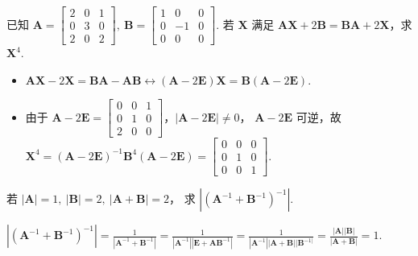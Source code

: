 \begin{problem}[本题8分]
  已知 $\mathbf A = 
  \begin{bmatrix}
    2 & 0 & 1\\
    0 & 3 & 0\\
    2 & 0 & 2
  \end{bmatrix},~
  \mathbf B = 
  \begin{bmatrix}
    1 & 0 & 0\\
    0 &-1 & 0\\
    0 & 0 & 0
  \end{bmatrix}$. 若 $\mathbf X$ 满足
  $\mathbf{AX} + 2\mathbf B = \mathbf{BA} + 2\mathbf X$，求 $\mathbf X^4$.
\end{problem}
\scratch[14ex]
\begin{solution}\leavevmode
  \begin{itemize}
    \item $\mathbf{AX} - 2\mathbf X = \mathbf{BA} - \mathbf{AB}
    \longleftrightarrow
      (\mathbf A - 2\mathbf E)\mathbf X = \mathbf B(\mathbf A - 2\mathbf E)$.
    \item 由于 $\mathbf A - 2\mathbf E =
    \begin{bmatrix}
      0 & 0 & 1\\
      0 & 1 & 0\\
      2 & 0 & 0
    \end{bmatrix}$，$|\mathbf A - 2\mathbf E| \neq 0$，
    $\mathbf A - 2\mathbf E$ 可逆，故
    $ \mathbf X^4 =
      (\mathbf A - 2\mathbf E)^{-1}\mathbf B^4(\mathbf A - 2\mathbf E)=
    \begin{bmatrix}
      0 & 0 & 0\\
      0 & 1 & 0\\
      0 & 0 & 1
    \end{bmatrix}$.
  \end{itemize}
\end{solution}

\begin{problem}[本题8分]
  若 $|\mathbf A| = 1,~ |\mathbf B| = 2,~ |\mathbf A + \mathbf B| = 2$，
  求 $|(\mathbf A^{-1} + \mathbf B^{-1})^{-1}|$.
\end{problem}
\scratch[14ex]
\begin{solution}
  $ |(\mathbf A^{-1} + \mathbf B^{-1})^{-1}|
  = \frac1{|\mathbf A^{-1} + \mathbf B^{-1}|}
  = \frac1{|\mathbf A^{-1}||\mathbf E + \mathbf{AB}^{-1}|}
  = \frac1{|\mathbf A^{-1}||\mathbf A + \mathbf B||\mathbf B^{-1|}}
  = \frac{|\mathbf A||\mathbf B|}{|\mathbf A + \mathbf B|} = 1$.
\end{solution}


